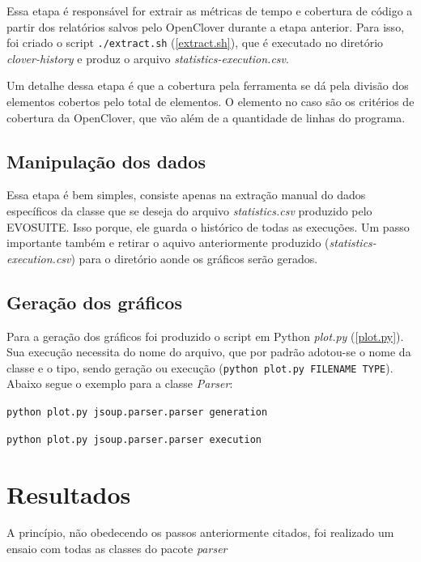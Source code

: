 Essa etapa é responsável for extrair as métricas de tempo e cobertura de código a partir dos relatórios salvos pelo OpenClover durante a etapa anterior. Para isso, foi criado o script \texttt{./extract.sh} (\ref{extract.sh}), que é executado no diretório \textit{clover-history} e produz o arquivo \textit{statistics-execution.csv}. 

Um detalhe dessa etapa é que a cobertura pela ferramenta se dá pela divisão dos elementos cobertos pelo total de elementos. O elemento no caso são os critérios de cobertura da OpenClover, que vão além de a quantidade de linhas do programa.

\subsection{Manipulação dos dados}

Essa etapa é bem simples, consiste apenas na extração manual do dados específicos da classe que se deseja do arquivo \textit{statistics.csv} produzido pelo EVOSUITE. Isso porque, ele guarda o histórico de todas as execuções. Um passo importante também e retirar o aquivo anteriormente produzido (\textit{statistics-execution.csv}) para o diretório aonde os gráficos serão gerados.

\subsection{Geração dos gráficos} 

Para a geração dos gráficos foi produzido o script em Python \textit{plot.py} (\ref{plot.py}). Sua execução necessita do nome do arquivo, que por padrão adotou-se o nome da classe e o tipo, sendo geração ou execução (\texttt{python plot.py FILENAME TYPE}). Abaixo segue o exemplo para a classe \textit{Parser}:

\texttt{python plot.py jsoup.parser.parser generation} 
 
\texttt{python plot.py jsoup.parser.parser execution}

\section{Resultados \label{sec:resultados}}

A princípio, não obedecendo os passos anteriormente citados, foi realizado um ensaio com todas as classes do pacote \textit{parser}

